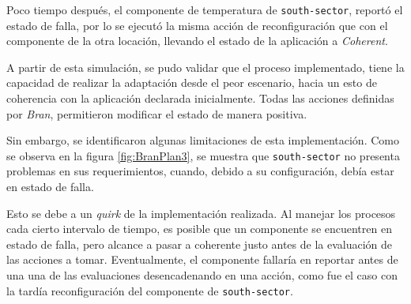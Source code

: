 Poco tiempo después, el componente de temperatura de \texttt{south-sector}, reportó el estado de falla, por lo se ejecutó la misma acción de reconfiguración que con el componente de la otra locación, llevando el estado de la aplicación a \textit{Coherent}.

A partir de esta simulación, se pudo validar que el proceso implementado, tiene la capacidad de realizar la adaptación desde el peor escenario, hacia un esto de coherencia con la aplicación declarada inicialmente. Todas las acciones definidas por \textit{Bran}, permitieron modificar el estado de manera positiva.

Sin embargo, se identificaron algunas limitaciones de esta implementación. Como se observa en la figura \ref{fig:BranPlan3}, se muestra que \texttt{south-sector} no presenta problemas en sus requerimientos, cuando, debido a su configuración, debía estar en estado de falla. 

Esto se debe a un \textit{quirk} de la implementación realizada. Al manejar los procesos cada cierto intervalo de tiempo, es posible que un componente se encuentren en estado de falla, pero alcance a pasar a coherente justo antes de la evaluación de las acciones a tomar. Eventualmente, el componente fallaría en reportar antes de una una de las evaluaciones desencadenando en una acción, como fue el caso con la tardía reconfiguración del componente de \texttt{south-sector}.